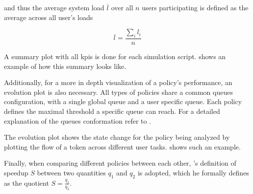 and thus the average system load $\overline{l}$ over all $n$ users participating is defined as the average across all user's loads \ie

\begin{equation}
	\overline{l} = \frac{\sum_i l_i}{n}
\end{equation}

A summary plot with all \glspl{kpi} is done for each simulation script.  shows an example of how this summary looks like.


Additionally, for a more in depth visualization of a policy's performance, an evolution plot is also necessary. All types of policies share a common queues configuration, with a single global queue and a user specific queue. Each policy defines the maximal threshold a specific queue can reach. For a detailed explanation of the queues conformation refer to .

The evolution plot shows the state change for the policy being analyzed by plotting the flow of a token across different user tasks.  shows such an example.


Finally, when comparing different policies between each other, \citet{Milo2012}'s definition of speedup $S$ between two quantities $q_1$ and $q_2$ is adopted, which he formally defines as the quotient $S=\frac{q_1}{q_2}$.